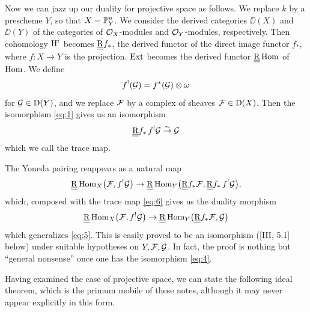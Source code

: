 Now we can jazz up our duality for projective space as follows. We replace $k$ by a prescheme $Y$, so that $X=\mathbb{P}_{Y}^{n}$. We consider the derived categories $\DD(X)$ and $\DD(Y)$ of the categories of $\mathcal{O}_{X}$-modules and $\mathcal{O}_{Y}$-modules, respectively. Then cohomology $\operatorname{H}^{i}$ becomes $\underline{\underline{\operatorname{R}}} f_{*}$, the derived functor of the direct image functor $f_{*}$, where $f\colon X\to Y$ is the projection. $\operatorname{Ext}$ becomes the derived functor $\underline{\underline{\operatorname{R}}}\operatorname{Hom}$ of $\operatorname{Hom}$. We define
\[
f^{!}(\mathcal{G})=f^{*}(\mathcal{G})\otimes\omega
\]
for $\mathcal{G}\in \operatorname{D}(Y)$, and we replace $\mathcal{F}$ by a complex of sheaves $\mathcal{F}\in \operatorname{D}(X)$. Then the isomorphism \eqref{eq:1} gives us an isomorphism
\begin{equation}\label{eq:6}
	\underline{\underline{\operatorname{R}}} f_{*}\,f^{!}\mathcal{G}\stackrel{\sim}{\to}\mathcal{G}
\end{equation}
which we call the trace map.

The Yoneda pairing reappears as a natural map
\begin{equation}\label{eq:7}
	\underline{\underline{\operatorname{R}}}\operatorname{Hom}_{X}\bigl(\mathcal{F},f^{!}\mathcal{G}\bigr)\to \underline{\underline{\operatorname{R}}}\operatorname{Hom}_{Y}\bigl(\underline{\underline{\operatorname{R}}} f_{*}\mathcal{F},\underline{\underline{\operatorname{R}}} f_{*}\,f^{!}\mathcal{G}\bigr),
\end{equation}
which, composed with the trace map \eqref{eq:6} gives us the duality morphism
\begin{equation}\label{eq:8}
	\underline{\underline{\operatorname{R}}}\operatorname{Hom}_{X}\bigl(\mathcal{F},f^{!}\mathcal{G}\bigr)\to \underline{\underline{\operatorname{R}}}\operatorname{Hom}_{Y}\bigl(\underline{\underline{\operatorname{R}}} f_{*}\mathcal{F},\mathcal{G}\bigr)
\end{equation}
which generalizes \eqref{eq:5}. This is easily proved to be an isomorphism ([III, 5.1] below) under suitable hypotheses on $Y,\mathcal{F},\mathcal{G}$. In fact, the proof is nothing but ``general nonsense'' once one has the isomorphism \eqref{eq:4}.

Having examined the case of projective space, we can state the following ideal theorem, which is the primum mobile of these notes, although it may never appear explicitly in this form.

